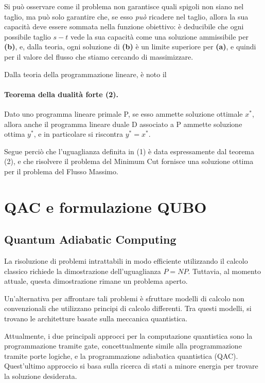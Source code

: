 \documentclass{article}
\begin{document}
Si può osservare come il problema non garantisce quali spigoli non siano nel taglio, ma può solo garantire che, se esso \emph{può} ricadere nel taglio, allora la sua capacità
deve essere sommata nella funzione obiettivo: è deducibile che ogni possibile taglio $s-t$ vede la sua capacità come una soluzione ammissibile per \textbf{(b)}, e, dalla teoria, ogni
soluzione di \textbf{(b)} è un limite superiore per \textbf{(a)}, e quindi per il valore del flusso che stiamo cercando di massimizzare.

Dalla teoria della programmazione lineare, è noto il

\paragraph{Teorema della dualità forte (2).} Dato uno programma lineare primale P, se esso ammette soluzione ottimale $x^*$, allora anche il programma lineare duale D associato a P 
ammette soluzione ottima $y^*$, e in particolare si riscontra $y^* = x^*$.

Segue perciò che l'uguaglianza definita in (1) è data espressamente dal teorema (2), e che risolvere il problema del Minimum Cut fornisce una soluzione ottima per il 
problema del Flusso Massimo. 
\pagebreak

\section{QAC e formulazione QUBO}

\subsection{Quantum Adiabatic Computing}
La risoluzione di problemi intrattabili in modo efficiente utilizzando il calcolo classico richiede la dimostrazione dell'uguaglianza $P = NP$. Tuttavia, al momento attuale, questa dimostrazione rimane un problema aperto.

Un'alternativa per affrontare tali problemi è sfruttare modelli di calcolo non convenzionali che utilizzano principi di calcolo differenti. Tra questi modelli, si trovano le architetture basate sulla meccanica quantistica.

Attualmente, i due principali approcci per la computazione quantistica sono la programmazione tramite gate, concettualmente simile alla programmazione tramite porte logiche, e la programmazione adiabatica quantistica (QAC). Quest'ultimo approccio si basa sulla ricerca di stati a minore energia per trovare la soluzione desiderata.
\end{document}
